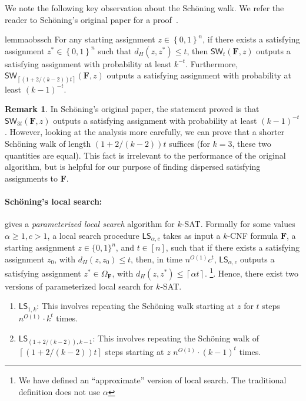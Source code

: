 \documentclass[11pt, letterpaper]{article}
\theoremstyle{definition}
\newtheorem{remark}{Remark}
\newcommand{\set}[1]{\left \{ #1 \right \}}
\newcommand{\Q}[1]{\{0,1\}^{#1}}
\newcommand{\f}{\mathbf{F}}
\newcommand{\Om}{\Omega_{\f}}
\newcommand{\LS}{\textsf{LS}}
\newcommand{\SW}{\textsf{SW}}
\newcommand{\sch}{Sch\"{o}ning\xspace}
\newcommand{\ceil}[1]{{\left\lceil{#1}\right\rceil}}
\begin{document}
\medskip \noindent
We note the following key observation about the \sch walk. We refer the reader to \sch's original paper for a proof~\cite{schoning1999probabilistic}. 
\begin{restatable}{lemma}{obssch} \label{obs:schmain}
    For any starting assignment $z \in \set{0,1}^n$, if there exists a satisfying assignment $z^* \in \set{0,1}^n$ such that $d_H(z,z^*) \leq t$, then $\SW_t(\f,z)$ outputs a satisfying assignment with probability at least $k^{-t}$. Furthermore, $\SW_{\ceil{\left(1+2/(k-2)\right)t}}(\f,z)$ outputs a satisfying assignment with probability at least $(k-1)^{-t}$.
\end{restatable}
\begin{remark}
    In \sch's original paper, the statement proved is that $\SW_{3t}(\f,z)$ outputs a satisfying assignment with probability at least $(k-1)^{-t}$. However, looking at the analysis more carefully, we can prove that a shorter \sch walk of length $\left(1+2/(k-2)\right)t$ suffices (for $k=3$, these two quantities are equal). This fact is irrelevant to the performance of the original algorithm, but is helpful for our purpose of finding dispersed satisfying assignments to $\f$. 
\end{remark}

\paragraph{\sch's local search: } gives a \emph{parameterized local search} algorithm for $k$-SAT. Formally for some values $\alpha \geq 1,c > 1$, a local search procedure $\LS_{\alpha,c}$ takes as input a $k$-CNF formula $\f$, a starting assignment $z \in \Q{n}$, and $t \in [n]$, such that if there exists a satisfying assignment $z_0$, with $d_H(z,z_0) \leq t$, then, in time $n^{O(1)} c^t$, $\LS_{\alpha,c}$ outputs a satisfying assignment $z^* \in \Om$, with $d_H(z, z^*) \leq \ceil{\alpha t}$. \footnote{We have defined an ``approximate'' version of local search. The traditional definition does not use $\alpha$}. Hence, there exist two versions of parameterized local search for $k$-SAT. 

\begin{enumerate}
    \item $\LS_{1,k}$: This involves repeating the \sch walk starting at $z$ for $t$ steps $n^{O(1)} \cdot k^t$ times.
    \item $\LS_{\left(1+2/(k-2)\right),k-1}$: This involves repeating the \sch walk of $\ceil{\left(1+2/(k-2)\right)t}$ steps starting at $z$ $n^{O(1)} \cdot (k-1)^t$ times.
\end{enumerate}
\end{document}
